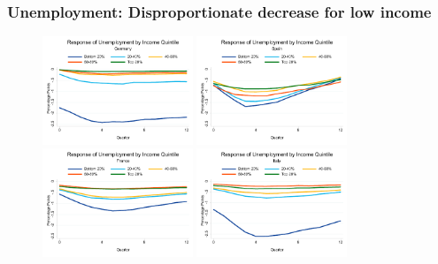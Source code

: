 \documentclass[pdflatex,aspectratio=169]{beamer}
\begin{document}
\begin{frame}\frametitle{\bf Unemployment: Disproportionate decrease for low income}

\begin{figure}
\begin{center}
\includegraphics[width=0.40\textwidth]{./figures/UR_chart_DE}
\includegraphics[width=0.40\textwidth]{./figures/UR_chart_ES}\\
\includegraphics[width=0.40\textwidth]{./figures/UR_chart_FR}
\includegraphics[width=0.40\textwidth]{./figures/UR_chart_IT}
\end{center}
\end{figure}

\end{frame}
\end{document}
